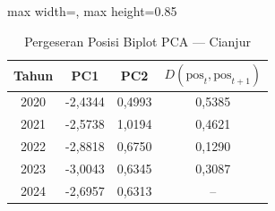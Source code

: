\begin{table}[H]
\centering
\caption{Pergeseran Posisi Biplot PCA --- Cianjur} \label{tab:appjarak_pca_skor_cianjur}
\begin{adjustbox}{max width=\textwidth, max height=0.85\textheight}
\begin{tabular}{|c|c|c|c|}
\hline
\textbf{Tahun} & \textbf{PC1} & \textbf{PC2} & \textbf{$D(\text{pos}_t, \text{pos}_{t+1})$} \\
\hline
2020 & -2,4344 & 0,4993 & 0,5385 \\
2021 & -2,5738 & 1,0194 & 0,4621 \\
2022 & -2,8818 & 0,6750 & 0,1290 \\
2023 & -3,0043 & 0,6345 & 0,3087 \\
2024 & -2,6957 & 0,6313 & -- \\
\hline
\end{tabular}
\end{adjustbox}
\end{table}